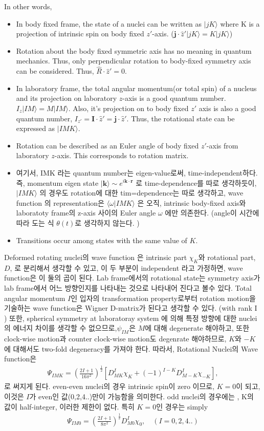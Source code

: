 \documentclass[11pt]{book}
\def\bm{\boldsymbol}
\def\vk{{\bm k}}
\def\vr{{\bm r}}
\def\la{\langle}
\def\ra{\rangle}
\newcommand{\bea}{\begin{eqnarray}}
\newcommand{\eea}{\end{eqnarray}}
\begin{document}
In other words, 
\begin{itemize}
	\item In body fixed frame, the state of a nuclei can be written as $|j K\ra$ where K is a projection 
	      of intrinsic spin on body fixed $z'$-axis. (${\bm j}\cdot\hat{z}'|j K\ra = K|j K\ra$)
	\item Rotation about the body fixed symmetric axis has no meaning in quantum mechanics.       
	      Thus, only perpendicular rotation to body-fixed symmetry axis can be considered. 
	      Thus, $\hat{R}\cdot\hat{z}'=0$. 
	\item In laboratory frame, the total angular momentum(or total spin) of a nucleus 
	      and its projection on laboratory $z$-axis is a good quantum number. $I_z|IM\ra = M|IM\ra$.
	      Also, it's projection on to body fixed $z'$ axis is also a good quantum number,
	      $I_{z'}={\bm I}\cdot{\hat{z}'}={\bm j}\cdot\hat{z}'$. Thus, the rotational state 
	      can be expressed as $|IM K\ra$.   
	\item Rotation can be described as an Euler angle of body fixed $z'$-axis from laboratory $z$-axis.
	      This corresponds to rotation matrix. 
	\item 여기서, IMK 라는 quantum number는 eigen-value로써, time-independent하다. 
	      즉, momentum eigen state $|\vk\ra\sim e^{i\vk\cdot\vr}$ 로 time-dependence를 따로 생각하듯이,
	      $|IMK\ra$ 의 경우도 rotation에 대한 tim=dependence는 따로 생각하고,
	       wave function 의 representation은 $\la \omega|IMK\ra$ 은 오직, intrinsic body-fixed axis와 
	       laboratoty frame의 z-axis 사이의 Euler angle $\omega$ 에만 의존한다. 
	       (angle이 시간에 따라 도는 식 $\theta(t)$로 생각하지 않는다. )    
	\item Transitions occur among states with the same value of $K$.                    
\end{itemize}

Deformed rotating nuclei의 wave function 은 
intrinsic part $\chi_K$와 rotational part, $D$, 로 분리해서 생각할 수 있고,
이 두 부분이 independent 라고 가정하면, wave function은 이 둘의 곱이 된다. 
Lab frame에서의 rotational state는 symmetry axis가 lab frame에서 어느 방향인지를 나타내는 것으로 
나타내어 진다고 볼수 있다.
Total angular momentum $I$인 입자의 transformation property로부터  
rotation motion을 기술하는 wave function은 Wigner D-matrix가 된다고 생각할 수 있다.
(with rank I ) 
또한, spherical symmetry at laboratoray system 에 의해 특정 방향에 대한 
nuclei 의 에너지 차이를 생각할 수 없으므로,$\psi_{I M}$은  $M$에 대해 degenerate
해야하고, 또한 clock-wise motion과 counter clock-wise motion도 degenrate 해야하므로,
$K$와 $-K$에 대해서도 two-fold degeneracy를 가져야 한다. 따라서,
Rotational Nuclei의 Wave function은 
\bea 
\Psi_{IMK}=\left(\frac{2I+1}{16\pi^2}\right)^{\frac{1}{2}}
   \left[ D^{I}_{MK} \chi_K +(-1)^{I-K} D^I_{M-K} \chi_{-K}\right],
\eea  
로 써지게 된다. even-even nuclei의 경우 intrinsic spin이 zero 이므로, $K=0$이 되고,
이것은 $I$가 even인 값(0,2,4..)만이 가능함을 의미한다. odd nuclei의 경우에는 , K의 값이 half-integer, 
이러한 제한이 없다. 특히 $K=0$인 경우는 simply
\bea 
\Psi_{IM0}=\left(\frac{2I+1}{8\pi^2}\right)^{\frac{1}{2}}D^{I}_{M0} \chi_0, \quad (I=0,2,4..)
\eea 
\end{document}
